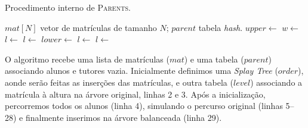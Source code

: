\begin{algorithm}[ht]
  \small
  \caption{Procedimento interno de \textsc{Parents}.}
  \label{alg:parent_inner}
  \begin{algorithmic}[1]
    \Require $mat[N]$ vetor de matrículas de tamanho $N$; $parent$ tabela \textit{hash}.
    \State $upper \gets$ 
    \Statex
    \State $w \gets$  
    \State $l \gets$  
    \State {} 
    \State {}
    \Statex
     
    \State $l \gets$ 
    \State {}
    \State {}
    \Statex
    \Else
    \State $lower \gets$  
    \Statex
    \State $l \gets$ 
    \State {}
    \State {}
    \Statex
    \Else
    \State $l \gets$ 
    \State {}
    \State {}
    \EndIf
    \EndIf {}
    
    \EndProcedure
  \end{algorithmic}
\end{algorithm}

O algoritmo recebe uma lista de matrículas ($mat$) e uma tabela ($parent$) associando alunos e
tutores vazia. Inicialmente definimos uma \textit{Splay Tree} ($order$), aonde
serão feitas as inserções das matrículas, e outra tabela ($level$) associando a matrícula à
altura na árvore original, linhas 2 e 3. Após a inicialização, percorremos todos
os alunos (linha 4), simulando o percurso original (linhas 5--28) e finalmente
inserimos na árvore balanceada (linha 29).

